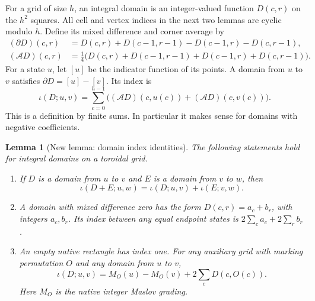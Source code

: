 \documentclass[11pt,oneside]{report}
\newtheorem{lemma}[theorem]{Lemma}
\theoremstyle{definition}
\numberwithin{equation}{section}
\begin{document}
For a grid of size $h$, an integral domain is an integer-valued function
$D(c,r)$ on the $h^2$ squares. All cell and vertex indices in the next
two lemmas are cyclic modulo $h$. Define its mixed difference and corner
average by
\[
 \begin{split}
 (\partial D)(c,r)
 &=D(c,r)+D(c-1,r-1)-D(c-1,r)-D(c,r-1),\\
 (\mathcal A D)(c,r)
 &=\tfrac14\bigl(D(c,r)+D(c-1,r-1)+D(c-1,r)+D(c,r-1)\bigr).
 \end{split}
\]
For a state $u$, let $[u]$ be the indicator function of its points.
A domain from $u$ to $v$ satisfies $\partial D=[u]-[v]$. Its index is
\[
 \iota(D;u,v)=\sum_{c=0}^{h-1}
 \bigl((\mathcal A D)(c,u(c))+(\mathcal A D)(c,v(c))\bigr).
\]
This is a definition by finite sums. In particular it makes sense for
domains with negative coefficients.

\begin{lemma}[New lemma: domain index identities]
\label{J05:lem:seam-domain-index}
The following statements hold for integral domains on a toroidal grid.
\begin{enumerate}
\item If $D$ is a domain from $u$ to $v$ and $E$ is a domain from
$v$ to $w$, then
\[
 \iota(D+E;u,w)=\iota(D;u,v)+\iota(E;v,w).
\]
\item A domain with mixed difference zero has the form
$D(c,r)=a_c+b_r$, with integers $a_c,b_r$. Its index between any equal
endpoint states is $2\sum_c a_c+2\sum_r b_r$.
\item An empty native rectangle has index one. For any auxiliary
grid with marking permutation $O$ and any domain from $u$ to $v$,
\begin{equation}\label{J05:eq:seam-domain-maslov}
 \iota(D;u,v)=M_O(u)-M_O(v)+2\sum_c D(c,O(c)).
\end{equation}
Here $M_O$ is the native integer Maslov grading.
\end{enumerate}
\end{lemma}
\end{document}
